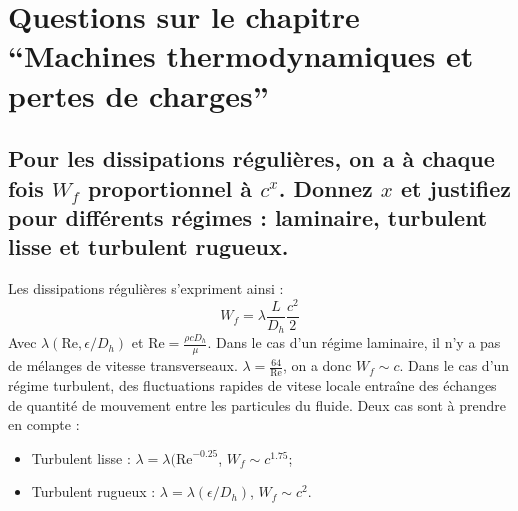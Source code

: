 \section{Questions sur le chapitre ``Machines thermodynamiques et pertes de charges''}
\subsection{Pour les dissipations régulières, on a à chaque fois $W_f$ proportionnel à $c^x$. Donnez $x$ et justifiez pour différents régimes : laminaire, turbulent lisse et turbulent rugueux.}
Les dissipations régulières s'expriment ainsi :
\begin{equation} W_f = \lambda\frac{L}{D_h}\frac{c^2}{2} \end{equation}
Avec $\lambda(\text{Re}, \epsilon/D_h)$ et $\text{Re} = \frac{\rho cD_h}{\mu}$.
Dans le cas d'un régime laminaire, il n'y a pas de mélanges de vitesse transverseaux. $\lambda = \frac{64}{\text{Re}}$, on a donc $W_f \sim c$. Dans le cas d'un régime turbulent, des fluctuations rapides de vitese locale entraîne des échanges de quantité de mouvement entre les particules du fluide. Deux cas sont à prendre en compte :
\begin{itemize}
	\item Turbulent lisse : $\lambda = \lambda(\text{Re}^{-0.25}$, $W_f \sim c^{1.75}$;
	\item Turbulent rugueux : $\lambda = \lambda(\epsilon/D_h)$, $W_f \sim c^2$.
\end{itemize}
